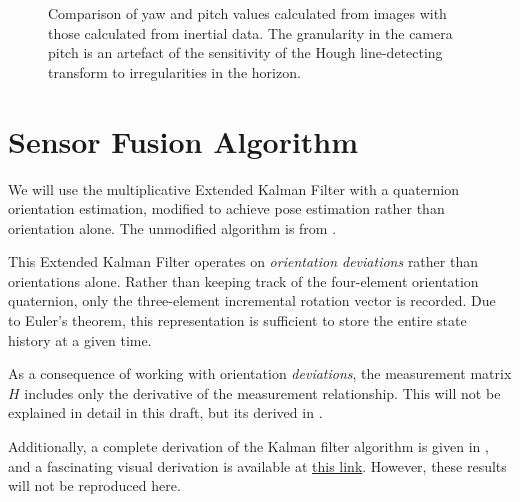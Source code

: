 \documentclass{article}
\begin{document}
\begin{figure}[htbp]%
    \centering
    \caption{Comparison of yaw and pitch values calculated from images with those calculated from inertial data. The granularity in the camera pitch is an artefact of the sensitivity of the Hough line-detecting transform to irregularities in the horizon.}%
    \label{fig:attcompare}
\end{figure}

\section{Sensor Fusion Algorithm} \label{sec:algorithm}
We will use the multiplicative Extended Kalman Filter with a quaternion orientation estimation, modified to achieve pose estimation rather than orientation alone. The unmodified algorithm is from \cite{usinginertialsensors}.

This Extended Kalman Filter operates on \textit{orientation deviations} rather than orientations alone. Rather than keeping track of the four-element orientation quaternion, only the three-element incremental rotation vector is recorded. Due to Euler's theorem, this representation is sufficient to store the entire state history at a given time. 

As a consequence of working with orientation \textit{deviations}, the measurement matrix $H$ includes only the derivative of the measurement relationship. This will not be explained in detail in this draft, but its derived in \cite{usinginertialsensors}.

Additionally, a complete derivation of the Kalman filter algorithm is given in \cite{appliedkalman}, and a fascinating visual derivation is available at \hyperlink{https://www.bzarg.com/p/how-a-kalman-filter-works-in-pictures/}{this link}. However, these results will not be reproduced here.
\end{document}
